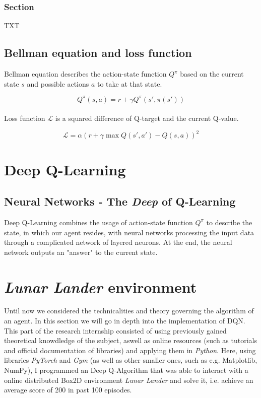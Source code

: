 \documentclass{article}
\begin{document}
\subsubsection{Section}
TXT

\subsection{Bellman equation and loss function}
Bellman equation describes the action-state function $Q^\pi$ based on the current state $s$ and possible actions $a$ to take at that state.

\begin{equation}
\label{eqn:bellman}
Q^\pi(s,a) = r+\gamma Q^\pi(s',\pi(s'))
\end{equation}
\\
Loss function $\mathcal{L}$ is a squared difference of Q-target and the current Q-value.

\begin{equation}
\label{eqn:loss}
\mathcal{L} = \alpha(r+\gamma\max Q(s',a')-Q(s,a))^2
\end{equation}

\section{Deep Q-Learning}
\subsection{Neural Networks - The \textit{Deep} of Q-Learning}
Deep Q-Learning combines the usage of action-state function $Q^\pi$ to describe the state, in which our agent resides, with neural networks processing the input data through a complicated network of layered neurons. At the end, the neural network outputs an "answer" to the current state.

\section{\textit{Lunar Lander} environment}
Until now we considered the technicalities and theory governing the algorithm of an agent. In this section we will go in depth into the implementation of DQN. This part of the research internship consisted of using previously gained theoretical knowdledge of the subject, aswell as online resources (such as tutorials and official documentation of libraries) and applying them in \textit{Python}. Here, using libraries \textit{PyTorch} and \textit{Gym} (as well as other smaller ones, such as e.g. Matplotlib, NumPy), I programmed an Deep Q-Algorithm that was able to interact with a online distributed Box2D environment  \textit{Lunar Lander} and solve it, i.e. achieve an average score of 200 in past 100 episodes.
\end{document}
